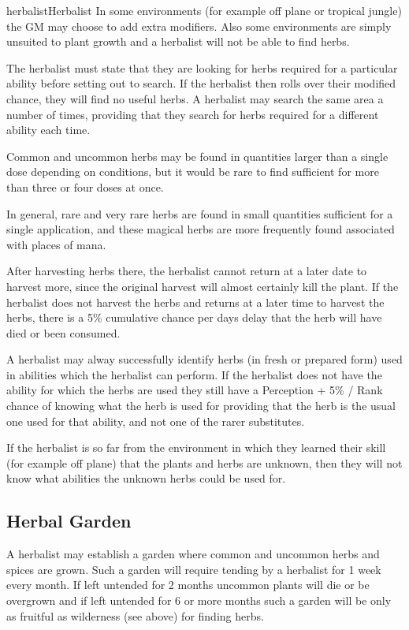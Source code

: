 \begin{Skill}[1.1]{herbalist}{Herbalist}
In some environments (for example off plane or tropical jungle) the GM
may choose to add extra modifiers.  Also some environments are simply
unsuited to plant growth and a herbalist will not be able to find
herbs.

The herbalist must state that they are looking for herbs required for
a particular ability before setting out to search.  If the herbalist
then rolls over their modified chance, they will find no useful
herbs. A herbalist may search the same area a number of times,
providing that they search for herbs required for a different ability
each time.

Common and uncommon herbs may be found in quantities larger than a
single dose depending on conditions, but it would be rare to find
sufficient for more than three or four doses at once.

In general, rare and very rare herbs are found in small quantities
sufficient for a single application, and these magical herbs are more
frequently found associated with places of mana.

After harvesting herbs there, the herbalist cannot return at a later
date to harvest more, since the original harvest will almost certainly
kill the plant.  If the herbalist does not harvest the herbs and
returns at a later time to harvest the herbs, there is a 5\%
cumulative chance per days delay that the herb will have died or been
consumed.

A herbalist may alway successfully identify herbs (in fresh or
prepared form) used in abilities which the herbalist can perform.  If
the herbalist does not have the ability for which the herbs are used
they still have a Perception + 5\% / Rank chance of knowing what the
herb is used for providing that the herb is the usual one used for
that ability, and not one of the rarer substitutes.

If the herbalist is so far from the environment in which they learned
their skill (for example off plane) that the plants and herbs are
unknown, then they will not know what abilities the unknown herbs
could be used for.

\subsection{Herbal Garden}

A herbalist may establish a garden where common and uncommon herbs and
spices are grown. Such a garden will require tending by a herbalist
for 1 week every month.  If left untended for 2 months uncommon plants
will die or be overgrown and if left untended for 6 or more months
such a garden will be only as fruitful as wilderness (see above) for
finding herbs.


\end{Skill}
